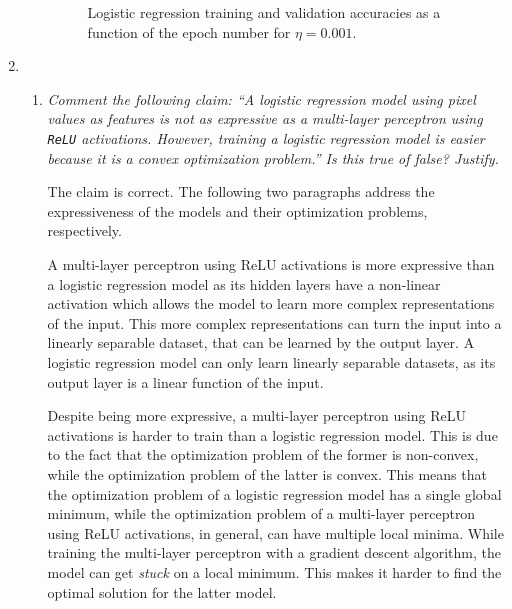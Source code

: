 \documentclass[12pt]{article}
\begin{document}
\begin{enumerate}[leftmargin=\labelsep]
\begin{enumerate}[label=\alph*)]
                    \begin{figure}[H]
                        \centering
                        
                        \caption{Logistic regression training and validation accuracies as a function of the epoch number for $\eta = 0.001$.}
                        \label{fig:logistic_regression-50-0.001}
                    \end{figure}

          \end{enumerate}

    \item

          \begin{enumerate}[label=\alph*)]

              \item \textit{Comment the following claim: “A logistic regression model using pixel values
                        as features is not as expressive as a multi-layer perceptron using \texttt{ReLU} activations.
                        However, training a logistic regression model is easier because it is a convex optimization
                        problem.” Is this true of false? Justify.}

                    \vspace{12pt}

                    The claim is correct. The following two paragraphs address the expressiveness of the models and their optimization problems, respectively.

                    \vspace{12pt}

                    A multi-layer perceptron using ReLU activations is more expressive than a logistic regression model as its hidden layers have a non-linear activation which allows the model to learn more complex representations of the input. This more complex representations can turn the input into a linearly separable dataset, that can be learned by the output layer. A logistic regression model can only learn linearly separable datasets, as its output layer is a linear function of the input.

                    \vspace{12pt}

                    Despite being more expressive, a multi-layer perceptron using ReLU activations is harder to train than a logistic regression model. This is due to the fact that the optimization problem of the former is non-convex, while the optimization problem of the latter is convex. This means that the optimization problem of a logistic regression model has a single global minimum, while the optimization problem of a multi-layer perceptron using ReLU activations, in general, can have multiple local minima. While training the multi-layer perceptron with a gradient descent algorithm, the model can get \textit{stuck} on a local minimum. This makes it harder to find the optimal solution for the latter model.


\end{enumerate}
\end{enumerate}
\end{document}
